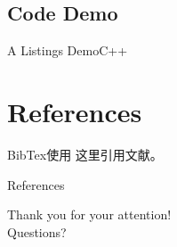 \documentclass[
10pt,
aspectratio=43,
]{beamer}
\begin{document}
\subsection{Code Demo}
\begin{frame}{A Listings Demo}{C++}
	\lstI
\end{frame}

\section{References}

\begin{frame}{BibTex使用}
	这里引用文献\cite{9492070}。
\end{frame}

\begin{frame}{References}
	


\end{frame}
\begin{frame}[plain]
	\vfill
	\centering
	{
		\centering \Huge \color{white} Thank you for your attention!\\[10pt]Questions?
	}
	\vfill
\end{frame}
\end{document}
